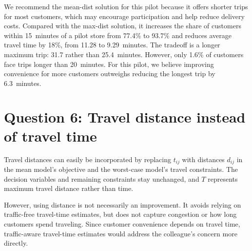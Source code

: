 \documentclass{article}
\begin{document}
We recommend the mean-dist solution for this pilot because it offers shorter trips for most customers, which may encourage participation and help reduce delivery costs. Compared with the max-dist solution, it increases the share of customers within 15~minutes of a pilot store from 77.4\% to 93.7\% and reduces average travel time by 18\%, from 11.28 to 9.29~minutes. The tradeoff is a longer maximum trip: 31.7 rather than 25.4~minutes. However, only 1.6\% of customers face trips longer than 20~minutes. For this pilot, we believe improving convenience for more customers outweighs reducing the longest trip by 6.3~minutes.
\par\medskip\noindent\begin{minipage}{\textwidth}
\section*{Question 6: Travel distance instead of travel time}

Travel distances can easily be incorporated by replacing $t_{ij}$ with distances
$d_{ij}$ in the mean model's objective and the worst-case model's travel constraints.
The decision variables and remaining constraints stay unchanged, and $T$ represents
maximum travel distance rather than time.

However, using distance is not necessarily an improvement. It avoids relying on
traffic-free travel-time estimates, but does not capture congestion or how long
customers spend traveling. Since customer convenience depends on travel time,
traffic-aware travel-time estimates would address the colleague's concern more directly.
\end{minipage}
\end{document}

